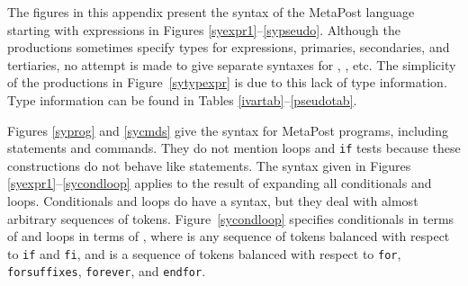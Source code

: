 The figures in this appendix present the syntax of the MetaPost language
starting with expressions in Figures \ref{syexpr1}--\ref{sypseudo}.
Although the productions sometimes specify types for expressions, primaries,
secondaries, and tertiaries, no attempt is made to give separate syntaxes
for , , etc.
The simplicity of the productions in Figure~\ref{sytypexpr} is due to this
lack of type information.  Type information
can be found in Tables \ref{ivartab}--\ref{pseudotab}.

Figures \ref{syprog} and \ref{sycmds} give the syntax for MetaPost programs,
including statements and commands.  They do not mention loops
and {\tt if}
tests because these constructions do not behave like statements.  The syntax
given in Figures \ref{syexpr1}--\ref{sycondloop} applies to the result of
expanding all conditionals and loops.  Conditionals and loops do have a
syntax, but they deal with almost arbitrary sequences of tokens.
Figure~\ref{sycondloop} specifies conditionals in terms of
 and loops in terms of , where
 is any sequence of tokens balanced with respect
to {\tt if} and {\tt fi}, and  is a sequence of tokens
balanced with respect to {\tt for}, {\tt forsuffixes}, {\tt forever},
and {\tt endfor}.

